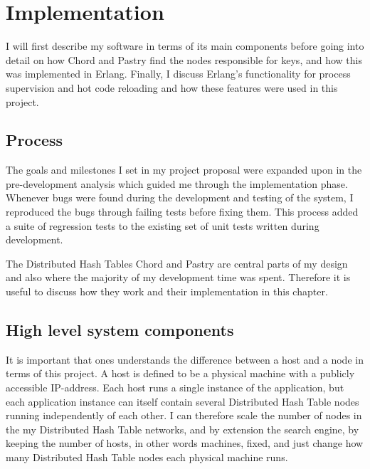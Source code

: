 

\chapter{Implementation}
I will first describe my software in terms of its main components before going into detail on how Chord and Pastry find the nodes responsible for keys, and how this was implemented in Erlang.
Finally, I discuss Erlang's functionality for process supervision and hot code reloading and how these features were used in this project.

\section{Process}
The goals and milestones I set in my project proposal were expanded upon in the pre-development analysis which guided me through the implementation phase.
Whenever bugs were found during the development and testing of the system, I reproduced the bugs through failing tests before fixing them. This process added a suite of regression tests to the existing set of unit tests written during development.

The Distributed Hash Tables Chord and Pastry are central parts of my design and also where the majority of my development time was spent. Therefore it is useful to discuss how they work and their implementation in this chapter.

\section{High level system components}
It is important that ones understands the difference between a host and a node in terms of this project. A host is defined to be a physical machine with a publicly accessible IP-address. 
Each host runs a single instance of the application, but each application instance can itself contain several Distributed Hash Table nodes running independently of each other. I can therefore scale the number of nodes in the my Distributed Hash Table networks, and by extension the search engine, by keeping the number of hosts, in other words machines, fixed, and just change how many Distributed Hash Table nodes each physical machine runs.

